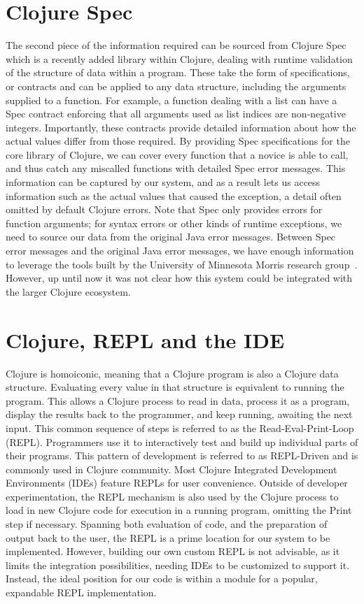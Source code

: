 \documentclass[12pt]{article}
\newcommand{\comment}[1]{{\bf \tt  {#1}}}
\begin{document}
\section{Clojure Spec}
The second piece of the information required can be sourced from Clojure Spec~\cite{spec}
which is a recently added library within Clojure, dealing with runtime validation of
the structure of data within a program. These take the form of specifications, or contracts
and can be applied to any data structure, including the arguments supplied to a function.
 For example, a function dealing with a list can have a Spec contract enforcing that all arguments
 used as list indices are non-negative integers.
Importantly, these contracts provide detailed information
 about how the actual values differ from those required.
By providing Spec specifications for the core library of Clojure,
 we can cover every function that a novice is able to call, and thus catch
 any miscalled functions with detailed Spec error messages.
 This information can be captured by our system, and as a result
 lets us access information such as the actual values that caused the exception,
 a detail often omitted by default Clojure errors.
Note that Spec only provides errors for function arguments; for syntax errors or other kinds of
runtime exceptions, we need to source our data from the original Java error messages.
Between Spec error messages and the original Java error messages, we have enough
information to leverage the tools built by the
 University of Minnesota Morris research group~\cite{mics2017}.
However, up until now it was not clear how this system could be integrated with the larger Clojure ecosystem.

\section{Clojure, REPL and the IDE}
Clojure is homoiconic, meaning that a Clojure program is also a Clojure data structure.
 Evaluating every value in that structure is
equivalent to running the program.
This allows a Clojure process to read in data, process it as a program, display the results
 back to the programmer, and keep running, awaiting the next input.
 This common sequence of steps is referred to
as the Read-Eval-Print-Loop (REPL). Programmers use it to interactively test and build up
individual parts of their programs. This pattern of development is
referred to as REPL-Driven and is commonly used in Clojure community.
 Most Clojure Integrated Development Environments (IDEs) feature REPLs for
 user convenience. Outside of developer experimentation, the REPL mechanism is also used
by the Clojure process to load in new Clojure code for execution in a running program,
omitting the Print step if necessary.
Spanning both evaluation of code, and the preparation of output back to the user,
the REPL is a prime location for our system to be implemented.
However, building our own custom REPL is not advisable, as it limits the
integration possibilities, needing IDEs to be customized to support it.
Instead, the ideal position for our code is within a module
 for a popular, expandable REPL implementation.
\end{document}
